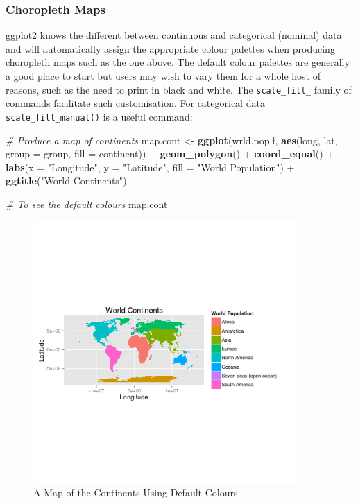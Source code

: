 \documentclass[]{article}
\newenvironment{Shaded}{}{}
\newcommand{\KeywordTok}[1]{\textcolor[rgb]{0.00,0.44,0.13}{\textbf{{#1}}}}
\newcommand{\DataTypeTok}[1]{\textcolor[rgb]{0.56,0.13,0.00}{{#1}}}
\newcommand{\StringTok}[1]{\textcolor[rgb]{0.25,0.44,0.63}{{#1}}}
\newcommand{\CommentTok}[1]{\textcolor[rgb]{0.38,0.63,0.69}{\textit{{#1}}}}
\newcommand{\NormalTok}[1]{{#1}}
\let\Oldincludegraphics\includegraphics
\renewcommand{\includegraphics}[1]{\Oldincludegraphics[width=10cm]{#1}}
\begin{document}
\subsubsection{Choropleth Maps}

ggplot2 knows the different between continuous and categorical (nominal)
data and will automatically assign the appropriate colour palettes when
producing choropleth maps such as the one above. The default colour
palettes are generally a good place to start but users may wish to vary
them for a whole host of reasons, such as the need to print in black and
white. The \texttt{scale\_fill\_} family of commands facilitate such
customisation. For categorical data \texttt{scale\_fill\_manual()} is a
useful command:

\begin{Shaded}
\begin{Highlighting}[]
\CommentTok{# Produce a map of continents}
\NormalTok{map.cont <- }\KeywordTok{ggplot}\NormalTok{(wrld.pop.f, }\KeywordTok{aes}\NormalTok{(long, lat, }\DataTypeTok{group =} \NormalTok{group, }\DataTypeTok{fill =} \NormalTok{continent)) + }
    \KeywordTok{geom_polygon}\NormalTok{() + }\KeywordTok{coord_equal}\NormalTok{() + }\KeywordTok{labs}\NormalTok{(}\DataTypeTok{x =} \StringTok{"Longitude"}\NormalTok{, }\DataTypeTok{y =} \StringTok{"Latitude"}\NormalTok{, }\DataTypeTok{fill =} \StringTok{"World Population"}\NormalTok{) + }
    \KeywordTok{ggtitle}\NormalTok{(}\StringTok{"World Continents"}\NormalTok{)}

\CommentTok{# To see the default colours}
\NormalTok{map.cont}
\end{Highlighting}
\end{Shaded}
\begin{figure}[htbp]
\centering
\includegraphics{figure/A_Map_of_the_Continents_Using_Default_Colours1.png}
\caption{A Map of the Continents Using Default Colours}
\end{figure}
\end{document}
